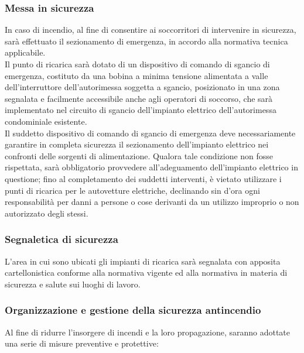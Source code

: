 \subsubsection{Messa in sicurezza}
In caso di incendio, al fine di consentire ai soccorritori di intervenire in sicurezza, sarà effettuato il sezionamento di emergenza, in accordo alla normativa tecnica applicabile. \\
Il punto di ricarica sarà dotato di un dispositivo di comando di sgancio di emergenza, costituto da una bobina a minima tensione alimentata a valle dell’interruttore dell’autorimessa soggetta a sgancio, posizionato in una zona segnalata e facilmente accessibile anche agli operatori di soccorso, che sarà implementato nel circuito di sgancio dell’impianto elettrico dell’autorimessa condominiale esistente. \\
Il suddetto dispositivo di comando di sgancio di emergenza deve necessariamente garantire in completa sicurezza il sezionamento dell’impianto elettrico nei confronti delle sorgenti di alimentazione. Qualora tale condizione non fosse rispettata, sarà obbligatorio provvedere all'adeguamento dell'impianto elettrico in questione; fino al completamento dei suddetti interventi, è vietato utilizzare i punti di ricarica per le autovetture elettriche, declinando sin d'ora ogni responsabilità per danni a persone o cose derivanti da un utilizzo improprio o non autorizzato degli stessi.

\subsubsection{Segnaletica di sicurezza}
L’area in cui sono ubicati gli impianti di ricarica sarà segnalata con apposita cartellonistica conforme alla normativa vigente ed alla normativa in materia di sicurezza e salute sui luoghi di lavoro.

\subsubsection{Organizzazione e gestione della sicurezza antincendio 
}
Al fine di ridurre l'insorgere di incendi e la loro propagazione, saranno adottate una serie di misure preventive e protettive:

